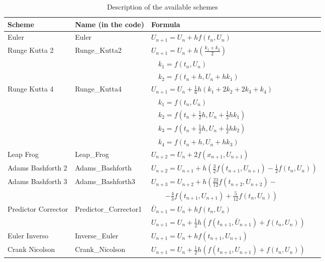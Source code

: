 \begin{table}[H]
	\begin{center}
		\begin{spacing}{1.5}
			\begin{tabular}{| l | l | l |}
				
				\hline
				
				\bf Scheme & \bf Name (in the code) & \bf Formula  \\ \hline \hline
				
				Euler & Euler & $  U_{n+1} = U_{n}+ h f(t_{n}, U_{n})$ \\ \hline
				
				Runge Kutta 2  &  Runge\_Kutta2   &  
				$ U_{n+1} = U_{n}+ h(\frac{k_{1}+k_{2}} {2} ) $ \\
				& & $\quad k_{1}= f(t_{n},U_{n}) $ \\
				& & $\quad k_{2}=f(t_{n}+h, U_{n}+hk_{1}) $ \\ \hline
				
				Runge Kutta 4 & Runge\_Kutta4 &  $ U_{n+1} = U_{n}+ \frac{1}{6}h (k_{1}+2k_{2}+2k_{3}+k_{4}) $ \\
				& & $\quad k_{1}= f(t_{n},U_{n}) $ \\
				& & $\quad k_{2}=f(t_{n}+\frac{1}{2}h, U_{n}+\frac{1}{2}hk_{1}) $ \\
				& & $\quad k_{3}=f(t_{n}+\frac{1}{2}h, U_{n}+\frac{1}{2}hk_{2}) $\\
				& & $\quad k_{4}= f(t_{n}+h,U_{n}+hk_{3}) $  \\ \hline
				
				Leap Frog & Leap\_Frog  & $ U_{n+2}=U_{n}+2f(x_{n+1},U_{n+1})$ \\ \hline
				
				Adams Bashforth 2 & Adams\_Bashforth  & $ U_{n+2}=U_{n+1}+ h \left( \frac{3}{2} f(t_{n+1},U_{n+1}) - \frac{1}{2} f(t_{n},U_{n}) \right) $  \\ \hline
				
				Adams Bashforth 3  & Adams\_Bashforth3  & $  U_{n+3} = U_{n+2}+ h \left( \frac{23}{12} f(t_{n+2},U_{n+2}) - \right.$ \\
				& & $\qquad\left.-\frac{4}{3} f(t_{n+1},U_{n+1}) + \frac{5}{12} f(t_{n},U_{n}) \right) $ \\ \hline
				
				Predictor Corrector & Predictor\_Corrector1  & $ \bar{U}_{n+1}=U_{n}+hf(t_{n},U_{n}) $ \\
				& & $ U_{n+1}=U_{n}+\frac{1}{2}h(f(t_{n+1},\bar{U}_{n+1})+f(t_{n},U_{n} )) $\\ \hline
				
				Euler Inverso & Inverse\_Euler & $ U_{n+1}=U_{n}+hf(t_{n+1},U_{n+1}) $\\ \hline
				
				Crank Nicolson & Crank\_Nicolson  & $  U_{n+1} = U_{n}+\frac{1}{2} h( f(t_{n+1}, U_{n+1})+f(t_{n},U_{n})) $ \\ \hline
			\end{tabular}
		\end{spacing}
	\end{center}
	\caption{Description of the available schemes }
\end{table}

